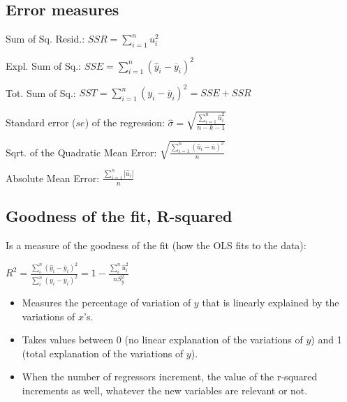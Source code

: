 \documentclass[10pt,landscape]{article}
\begin{document}
\begin{multicols}{3}

\subsection*{Error measures}

Sum of Sq. Resid.: $SSR = \sum_{i=1}^n u_i^2$

Expl. Sum of Sq.: $SSE = \sum_{i=1}^n (\hat{y}_i - \overline{y}_i)^2$

Tot. Sum of Sq.: $SST = \sum_{i=1}^n (y_i - \overline{y}_i)^2 = SSE + SSR$



Standard error ($se$) of the regression: $\hat{\sigma} = \sqrt{\frac{\sum_{i=1}^n \hat{u}_i^2}{n-k-1}}$

Sqrt. of the Quadratic Mean Error: $\sqrt{\frac{\sum_{i=1}^n (\hat{u}_i - \overline{u})^2}{n}}$

Absolute Mean Error: $\frac{\sum_{i=1}^n |\hat{u}_i|}{n}$

\subsection*{Goodness of the fit, R-squared}

Is a measure of the goodness of the fit (how the OLS fits to the data):

$R^2 = \frac{\sum_i^n (\hat{y}_i - \overline{y}_i)^2}{\sum_i^n (y_i - \overline{y}_i)^2} = 1 - \frac{\sum_i^n \hat{u}_i^2}{nS_y^2}$

\begin{itemize}[leftmargin=*]
\item Measures the percentage of variation of $y$ that is linearly explained by the variations of $x$'s.
\item Takes values between 0 (no linear explanation of the variations of $y$) and 1 (total explanation of the variations of $y$).
\item When the number of regressors increment, the value of the r-squared increments as well, whatever the new variables are relevant or not.
\end{itemize}


\end{multicols}
\end{document}
